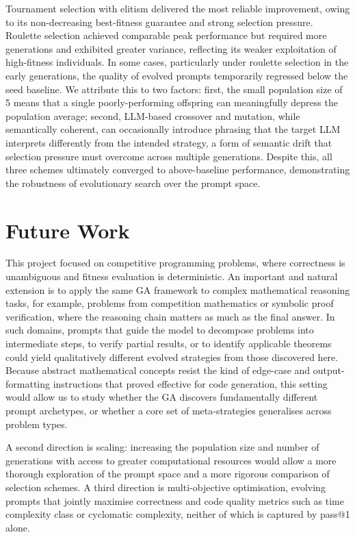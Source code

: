 \documentclass[conference]{IEEEtran}
\begin{document}
Tournament selection with elitism delivered the most reliable improvement, owing to its
non-decreasing best-fitness guarantee and strong selection pressure. Roulette selection
achieved comparable peak performance but required more generations and exhibited greater
variance, reflecting its weaker exploitation of high-fitness individuals. In some cases,
particularly under roulette selection in the early generations, the quality of evolved prompts
temporarily regressed below the seed baseline. We attribute this to two factors: first, the
small population size of 5 means that a single poorly-performing offspring can meaningfully
depress the population average; second, LLM-based crossover and mutation, while semantically
coherent, can occasionally introduce phrasing that the target LLM interprets differently
from the intended strategy, a form of semantic drift that selection pressure must overcome
across multiple generations. Despite this, all three schemes ultimately converged to
above-baseline performance, demonstrating the robustness of evolutionary search over the
prompt space.

\section{Future Work}
\label{sec:future}

This project focused on competitive programming problems, where correctness is unambiguous
and fitness evaluation is deterministic. An important and natural extension is to apply the
same GA framework to complex mathematical reasoning tasks, for example, problems from
competition mathematics or symbolic proof verification, where the reasoning chain matters
as much as the final answer. In such domains, prompts that guide the model to decompose
problems into intermediate steps, to verify partial results, or to identify applicable
theorems could yield qualitatively different evolved strategies from those discovered here.
Because abstract mathematical concepts resist the kind of edge-case and output-formatting
instructions that proved effective for code generation, this setting would allow us to
study whether the GA discovers fundamentally different prompt archetypes, or whether a
core set of meta-strategies generalises across problem types.

A second direction is scaling: increasing the population size and number of generations
with access to greater computational resources would allow a more thorough exploration of
the prompt space and a more rigorous comparison of selection schemes. A third direction is
multi-objective optimisation, evolving prompts that jointly maximise correctness and
code quality metrics such as time complexity class or cyclomatic complexity, neither of
which is captured by pass@1 alone.
\end{document}
